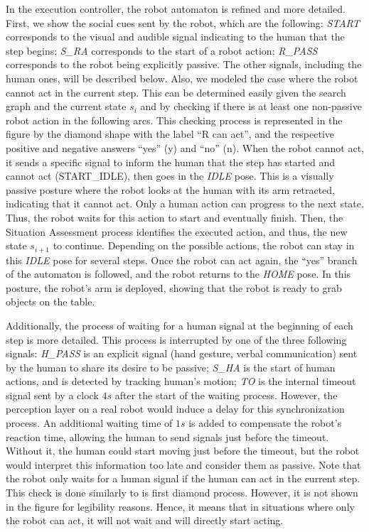 In the execution controller, the robot automaton is refined and more detailed. 
First, we show the social cues sent by the robot, which are the following: \textit{START} corresponds to the visual and audible signal indicating to the human that the step begins; \textit{S\_RA} corresponds to the start of a robot action; \textit{R\_PASS} corresponds to the robot being explicitly passive. The other signals, including the human ones, will be described below.
Also, we modeled the case where the robot cannot act in the current step. This can be determined easily given the search graph and the current state $s_i$ and by checking if there is at least one non-passive robot action in the following arcs. This checking process is represented in the figure by the diamond shape with the label ``R can act'', and the respective positive and negative answers ``yes'' (y) and ``no'' (n). When the robot cannot act, it sends a specific signal to inform the human that the step has started and cannot act (START\_IDLE), then goes in the \textit{IDLE} pose. This is a visually passive posture where the robot looks at the human with its arm retracted, indicating that it cannot act. Only a human action can progress to the next state. Thus, the robot waits for this action to start and eventually finish. Then, the Situation Assessment process identifies the executed action, and thus, the new state $s_{i+1}$ to continue. Depending on the possible actions, the robot can stay in this \textit{IDLE} pose for several steps. Once the robot can act again, the ``yes'' branch of the automaton is followed, and the robot returns to the \textit{HOME} pose. In this posture, the robot's arm is deployed, showing that the robot is ready to grab objects on the table.

Additionally, the process of waiting for a human signal at the beginning of each step is more detailed. This process is interrupted by one of the three following signals: \textit{H\_PASS} is an explicit signal (hand gesture, verbal communication) sent by the human to share its desire to be passive; \textit{S\_HA} is the start of human actions, and is detected by tracking human's motion; \textit{TO} is the internal timeout signal sent by a clock $4s$ after the start of the waiting process. 
However, the perception layer on a real robot would induce a delay for this synchronization process. 
An additional waiting time of $1s$ is added to compensate the robot's reaction time, allowing the human to send signals just before the timeout. Without it, the human could start moving just before the timeout, but the robot would interpret this information too late and consider them as passive.
Note that the robot only waits for a human signal if the human can act in the current step. This check is done similarly to is first diamond process. However, it is not shown in the figure for legibility reasons. Hence, it means that in situations where only the robot can act, it will not wait and will directly start acting.

